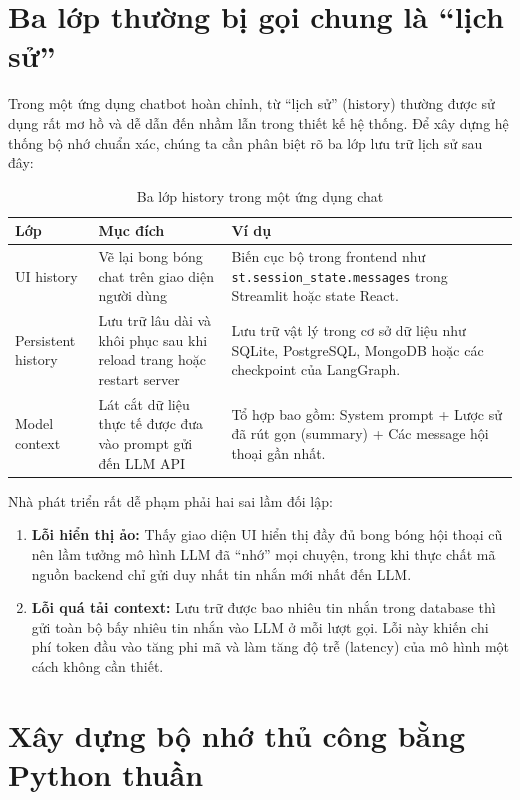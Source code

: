 \section{Ba lớp thường bị gọi chung là ``lịch sử''}

Trong một ứng dụng chatbot hoàn chỉnh, từ ``lịch sử'' (history) thường được sử dụng rất mơ hồ và dễ dẫn đến nhầm lẫn trong thiết kế hệ thống. Để xây dựng hệ thống bộ nhớ chuẩn xác, chúng ta cần phân biệt rõ ba lớp lưu trữ lịch sử sau đây:

\begin{table}[H]
\centering
\caption{Ba lớp history trong một ứng dụng chat}
\begin{tabular}{p{3.3cm}p{5.1cm}p{6.2cm}}
\toprule
\textbf{Lớp} & \textbf{Mục đích} & \textbf{Ví dụ} \\
\midrule
UI history & Vẽ lại bong bóng chat trên giao diện người dùng & Biến cục bộ trong frontend như \texttt{st.session\_state.messages} trong Streamlit hoặc state React. \\
Persistent history & Lưu trữ lâu dài và khôi phục sau khi reload trang hoặc restart server & Lưu trữ vật lý trong cơ sở dữ liệu như SQLite, PostgreSQL, MongoDB hoặc các checkpoint của LangGraph. \\
Model context & Lát cắt dữ liệu thực tế được đưa vào prompt gửi đến LLM API & Tổ hợp bao gồm: System prompt + Lược sử đã rút gọn (summary) + Các message hội thoại gần nhất. \\
\bottomrule
\end{tabular}
\end{table}

Nhà phát triển rất dễ phạm phải hai sai lầm đối lập:
\begin{enumerate}
  \item \textbf{Lỗi hiển thị ảo:} Thấy giao diện UI hiển thị đầy đủ bong bóng hội thoại cũ nên lầm tưởng mô hình LLM đã ``nhớ'' mọi chuyện, trong khi thực chất mã nguồn backend chỉ gửi duy nhất tin nhắn mới nhất đến LLM.
  \item \textbf{Lỗi quá tải context:} Lưu trữ được bao nhiêu tin nhắn trong database thì gửi toàn bộ bấy nhiêu tin nhắn vào LLM ở mỗi lượt gọi. Lỗi này khiến chi phí token đầu vào tăng phi mã và làm tăng độ trễ (latency) của mô hình một cách không cần thiết.
\end{enumerate}

\section{Xây dựng bộ nhớ thủ công bằng Python thuần}


